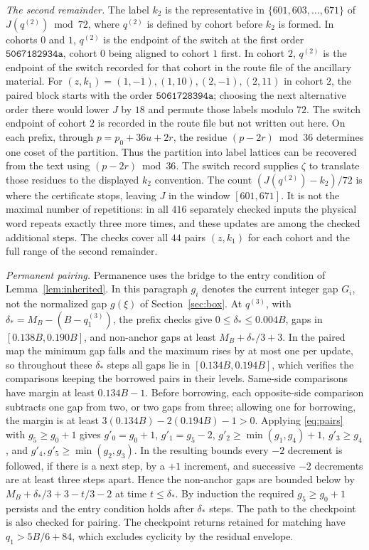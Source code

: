 \documentclass[11pt,reqno]{amsart}
\theoremstyle{remark}
\begin{document}
\emph{The second remainder.} The label \(k_2\) is the representative in \(\{601,603,\ldots,671\}\) of \(J(q^{(2)})\bmod72\), where \(q^{(2)}\) is defined by cohort before \(k_2\) is formed. In cohorts \(0\) and \(1\), \(q^{(2)}\) is the endpoint of the switch at the first order \(\mathtt{5067182934a}\), cohort \(0\) being aligned to cohort \(1\) first. In cohort \(2\), \(q^{(2)}\) is the endpoint of the switch recorded for that cohort in the route file of the ancillary material. For \((z,k_1)=(1,-1),(1,10),(2,-1),(2,11)\) in cohort \(2\), the paired block starts with the order \(\mathtt{5061728394a}\); choosing the next alternative order there would lower \(J\) by \(18\) and permute those labels modulo \(72\). The switch endpoint of cohort \(2\) is recorded in the route file but not written out here. On each prefix, through \(p=p_0+36u+2r\), the residue \((p-2r)\bmod 36\) determines one coset of the partition. Thus the partition into label lattices can be recovered from the text using \((p-2r)\bmod36\). The switch record supplies \(\zeta\) to translate those residues to the displayed \(k_2\) convention. The count \((J(q^{(2)})-k_2)/72\) is where the certificate stops, leaving \(J\) in the window \([601,671]\). It is not the maximal number of repetitions: in all \(416\) separately checked inputs the physical word repeats exactly three more times, and these updates are among the checked additional steps. The checks cover all \(44\) pairs \((z,k_1)\) for each cohort and the full range of the second remainder.

\emph{Permanent pairing.} Permanence uses the bridge to the entry condition of Lemma~\ref{lem:inherited}. In this paragraph \(g_i\) denotes the current integer gap \(G_i\), not the normalized gap \(g(\xi)\) of Section~\ref{sec:box}. At \(q^{(3)}\), with \(\delta_*=M_B-(B-q^{(3)}_1)\), the prefix checks give \(0\le \delta_*\le0.004B\), gaps in \([0.138B,0.190B]\), and non-anchor gaps at least \(M_B+\delta_*/3+3\). In the paired map the minimum gap falls and the maximum rises by at most one per update, so throughout these \(\delta_*\) steps all gaps lie in \([0.134B,0.194B]\), which verifies the comparisons keeping the borrowed pairs in their levels. Same-side comparisons have margin at least \(0.134B-1\). Before borrowing, each opposite-side comparison subtracts one gap from two, or two gaps from three; allowing one for borrowing, the margin is at least \(3(0.134B)-2(0.194B)-1>0\). Applying \eqref{eq:pairs} with \(g_5\ge g_0+1\) gives \(g'_0=g_0+1\), \(g'_1=g_5-2\), \(g'_2\ge\min(g_1,g_4)+1\), \(g'_3\ge g_4\), and \(g'_4,g'_5\ge\min(g_2,g_3)\). In the resulting bounds every \(-2\) decrement is followed, if there is a next step, by a \(+1\) increment, and successive \(-2\) decrements are at least three steps apart. Hence the non-anchor gaps are bounded below by \(M_B+\delta_*/3+3-t/3-2\) at time \(t\le \delta_*\). By induction the required \(g_5\ge g_0+1\) persists and the entry condition holds after \(\delta_*\) steps. The path to the checkpoint is also checked for pairing. The checkpoint returns retained for matching have \(q_1>5B/6+84\), which excludes cyclicity by the residual envelope.
\end{document}
